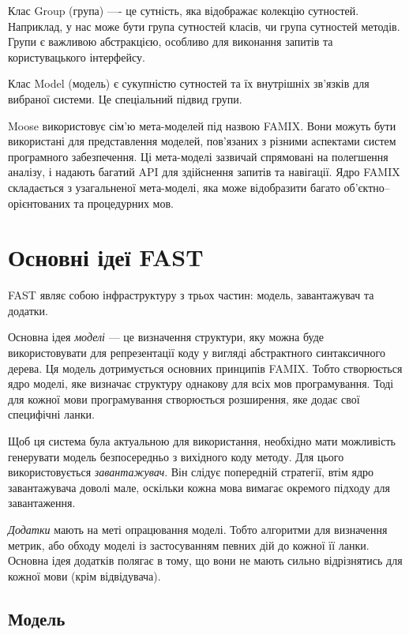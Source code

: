 \documentclass[12pt,a4paper]{article}
\begin{document}
Клас Group (група) ---- це сутність, яка відображає колекцію сутностей. Наприклад, у нас може бути група сутностей класів, чи група сутностей методів. Групи є важливою абстракцією, особливо для виконання запитів та користувацького інтерфейсу.

Клас Model (модель) є сукупністю сутностей та їх внутрішніх зв'язків для вибраної системи. Це спеціальний підвид групи.

Moose використовує сім'ю мета-моделей під назвою FAMIX. Вони можуть бути використані для представлення моделей, пов'язаних з різними аспектами систем програмного забезпечення. Ці мета-моделі зазвичай спрямовані на полегшення аналізу,  і надають багатий API для здійснення запитів та навігації. Ядро FAMIX складається з узагальненої мета-моделі, яка може відобразити багато об'єктно--орієнтованих та процедурних мов. 

\clearpage

\section{Основні ідеї FAST}

FAST являє собою інфраструктуру з трьох частин: модель, завантажувач та додатки.

Основна ідея \emph{моделі} --- це визначення структури, яку можна буде використовувати для репрезентації коду у вигляді абстрактного синтаксичного дерева. Ця модель дотримується основних принципів FAMIX. Тобто створюється ядро моделі, яке визначає структуру однакову для всіх мов програмування. Тоді для кожної мови програмування створюється розширення, яке додає свої специфічні ланки.

Щоб ця система була актуальною для використання, необхідно мати можливість генерувати модель безпосередньо з вихідного коду методу. Для цього використовується \emph{завантажувач}. Він слідує попередній стратегії, втім ядро завантажувача доволі мале, оскільки кожна мова вимагає окремого підходу для завантаження.

\emph{Додатки} мають на меті опрацювання моделі. Тобто алгоритми для визначення метрик, або обходу моделі із застосуванням певних дій до кожної її ланки. Основна ідея додатків полягає в тому, що вони не мають сильно відрізнятись для кожної мови (крім відвідувача).

\subsection{Модель}
\end{document}
